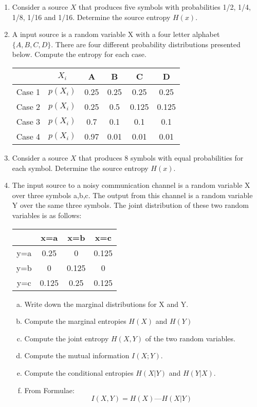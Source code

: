 \documentclass[a4paper,12pt]{article}
\begin{document}
\newpage
{}
\begin{enumerate}
\item Consider a source $X$ that produces five symbols with probabilities 1/2, 1/4, 1/8, 1/16 and 1/16. Determine the source entropy $H(x)$. 

\item A input source is a random variable X with a four letter alphabet $\{A,B,C,D\}$.
There are four different probability distributions presented below. Compute the entropy for each case.
\begin{center}
\begin{tabular}{|c c|c|c|c|c|}
\hline	&	$X_i$	&	A	&	B	&	C	&	D	\\ \hline
Case 1	&	$p(X_i)$	&	0.25	&	0.25	&	0.25	&	0.25	\\ \hline
Case 2	&	$p(X_i)$	&	0.25	&	0.5	&	0.125	&	0.125	\\ \hline
Case 3	&	$p(X_i)$	&	0.7	&	0.1	&	0.1	&	0.1	\\ \hline
Case 4	&	$p(X_i)$	&	0.97	&	0.01	&	0.01	&	0.01	\\ \hline
\end{tabular} 
\end{center}
\item 
Consider a source $X$ that produces 8 symbols with equal probabilities for each symbol. Determine the source entropy $H(x)$. 

    \item 
The input source to a noisy communication channel is a random variable X over three symbols a,b,c. The output from this channel is a random variable Y over the same three symbols. The joint distribution of these two random variables is as follows:


\begin{center}
\begin{tabular}{|c|c|c|c|}
\hline	 &x=a	&x=b&	     x=c\\ \hline
y=a	 &0.25	&0	 &    0.125 \\ \hline
y=b	 &0	    &0.125&	 0 \\ \hline
y=c	 &0.125&	0.25&	 0.125 \\ \hline
\end{tabular} 
\end{center}

\begin{enumerate}[(a)]
\item Write down the marginal distributions for X and Y. %
\item Compute the marginal entropies $H(X)$ and $H(Y)$ %
\item Compute the joint entropy $H(X,Y)$ of the two random variables. %
\item
Compute the mutual information $I(X;Y)$.
\item 
Compute the conditional entropies $H(X|Y)$ and $H(Y|X)$.
\item 
From Formulae: \[I(X,Y) = H(X) — H(X|Y)\]
\end{enumerate}


\end{enumerate}
\end{document}
